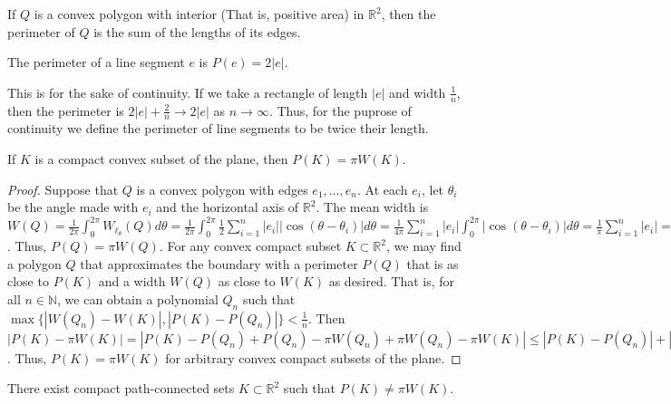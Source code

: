 \documentclass[crop=false,class=book,oneside]{standalone}
\begin{document}
            \begin{definition}
            If $Q$ is a convex polygon with interior (That is, positive area) in $\mathbb{R}^2$, then the perimeter of $Q$ is the sum of the lengths of its edges. 
            \end{definition}
            \begin{definition}
            The perimeter of a line segment $e$ is $P(e) = 2|e|$.
            \end{definition}
            \begin{remark}
            This is for the sake of continuity. If we take a rectangle of length $|e|$ and width $\frac{1}{n}$, then the perimeter is $2|e|+\frac{2}{n} \rightarrow 2|e|$ as $n\rightarrow \infty$. Thus, for the puprose of continuity we define the perimeter of line segments to be twice their length.
            \end{remark}
            \begin{theorem}
            If $K$ is a compact convex subset of the plane, then $P(K) = \pi W(K)$.
            \end{theorem}
            \begin{proof}
            Suppose that $Q$ is a convex polygon with edges $e_1,\hdots, e_n$. At each $e_i$, let $\theta_i$ be the angle made with $e_i$ and the horizontal axis of $\mathbb{R}^2$. The mean width is $W(Q) = \frac{1}{2\pi}\int_{0}^{2\pi} W_{\ell_\theta}(Q)d\theta = \frac{1}{2\pi} \int_{0}^{2\pi} \frac{1}{2} \sum_{i=1}^{n} |e_i||\cos(\theta-\theta_i)|d\theta = \frac{1}{4\pi}\sum_{i=1}^{n} |e_i|\int_{0}^{2\pi} |\cos(\theta-\theta_i)|d\theta = \frac{1}{\pi} \sum_{i=1}^{n} |e_i| = \frac{1}{\pi} P(Q)$. Thus, $P(Q) = \pi W(Q)$. For any convex compact subset $K\subset \mathbb{R}^2$, we may find a polygon $Q$ that approximates the boundary with a perimeter $P(Q)$ that is as close to $P(K)$ and a width $W(Q)$ as close to $W(K)$ as desired. That is, for all $n\in \mathbb{N}$, we can obtain a polynomial $Q_n$ such that $\max\{|W(Q_n)-W(K)|,|P(K)-P(Q_n)|\}< \frac{1}{n}$. Then $|P(K)-\pi W(K)| = |P(K) - P(Q_n)+P(Q_n)-\pi W(Q_n)+\pi W(Q_n)-\pi W(K)| \leq |P(K)-P(Q_n)|+|P(Q_n)-\pi W(Q_n)|+\pi|W(Q_n)-W(K)| < \frac{1}{n} + 0 + \frac{\pi}{n} = \frac{1+\pi}{n} \rightarrow 0$. Thus, $P(K) = \pi W(K)$ for arbitrary convex compact subsets of the plane.
            \end{proof}
            \begin{theorem}
            There exist compact path-connected sets $K\subset \mathbb{R}^2$ such that $P(K) \ne \pi W(K)$.
            \end{theorem}
\end{document}
